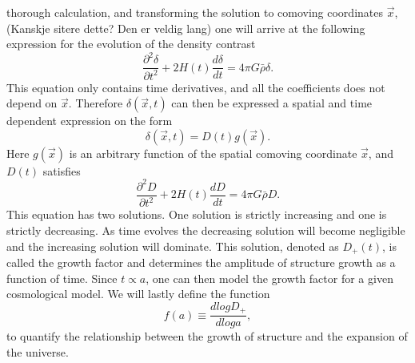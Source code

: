 thorough calculation, and transforming the solution to comoving coordinates $\vec{x}$, (Kanskje sitere dette? Den er veldig lang) one will arrive at the following expression for the
evolution of the density contrast
\begin{equation}
    \frac{\partial^2 \delta}{\partial t^2} + 2H(t) \frac{d \delta}{dt}=4\pi G\bar{\rho}\delta.
\end{equation}
This equation only contains time derivatives, and all the coefficients does not
depend on $\vec{x}$. Therefore $\delta(\vec{x}, t)$ can then be expressed a spatial and time
dependent expression on the form 
\begin{equation}
    \delta(\vec{x}, t) = D(t)g(\vec{x}).
\end{equation}
Here $g(\vec{x})$ is an arbitrary function of the spatial comoving coordinate
$\vec{x}$, and $D(t)$ satisfies
\begin{equation}
    \frac{\partial^2 D}{\partial t^2} + 2H(t) \frac{d D}{dt}=4\pi G\bar{\rho}D.
\end{equation}
This equation has two solutions. One solution is strictly increasing and one is
strictly decreasing. As time evolves the decreasing solution will become negligible
and the increasing solution will dominate. This solution, denoted as $D_+(t)$,
is called the growth factor and determines the amplitude of structure growth as
a function of time. Since $t\propto a$, one can then model the growth factor for
a given cosmological model. We will lastly define the function
\begin{equation}\label{eq:growthfac}
    f(a) \equiv \frac{d log D_+}{d log a},
\end{equation}
to quantify the relationship between the growth of structure and the expansion
of the universe.

